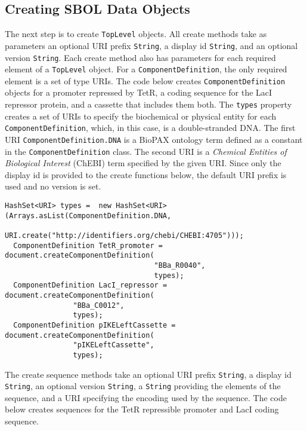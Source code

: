 \subsection*{Creating SBOL Data Objects}
The next step is to create \lstinline+TopLevel+ objects.  All create methods take as parameters an optional URI prefix \lstinline+String+, a display id \lstinline+String+, and an optional version \lstinline+String+.  Each create method also has parameters for each required element of a \lstinline+TopLevel+ object.  For a \lstinline+ComponentDefinition+, the only required element is a set of type URIs.  The code below creates \lstinline+ComponentDefinition+ objects for a promoter repressed by TetR, a coding sequence for the LacI repressor protein, and a cassette that includes them both.  The \lstinline+types+ property creates a set of URIs to specify the biochemical or physical entity for each \lstinline+ComponentDefinition+, which, in this case, is a double-stranded DNA. The first URI \lstinline+ComponentDefinition.DNA+ is a BioPAX ontology term defined as a constant in the \lstinline+ComponentDefinition+ class. The second URI is a \emph{Chemical Entities of Biological Interest} (ChEBI) term specified by the given URI.  Since only the display id is provided to the create functions below, the default URI prefix is used and no version is set.

\begin{minipage}{0.95\textwidth} 
\begin{lstlisting}[basicstyle=\footnotesize\ttfamily]
  HashSet<URI> types =  new HashSet<URI>(Arrays.asList(ComponentDefinition.DNA,
                          URI.create("http://identifiers.org/chebi/CHEBI:4705")));
  ComponentDefinition TetR_promoter = document.createComponentDefinition(
                                   "BBa_R0040",
                                   types);
  ComponentDefinition LacI_repressor = document.createComponentDefinition(
				"BBa_C0012", 
				types);
  ComponentDefinition pIKELeftCassette = document.createComponentDefinition(
				"pIKELeftCassette", 
				types);
\end{lstlisting}
\end{minipage}

The create sequence methods take an optional URI prefix \lstinline+String+, a display id \lstinline+String+, an optional version \lstinline+String+, a \lstinline+String+ providing the elements of the sequence, and a URI specifying the encoding used by the sequence.  The code below
creates sequences for the TetR repressible promoter and LacI coding sequence.

